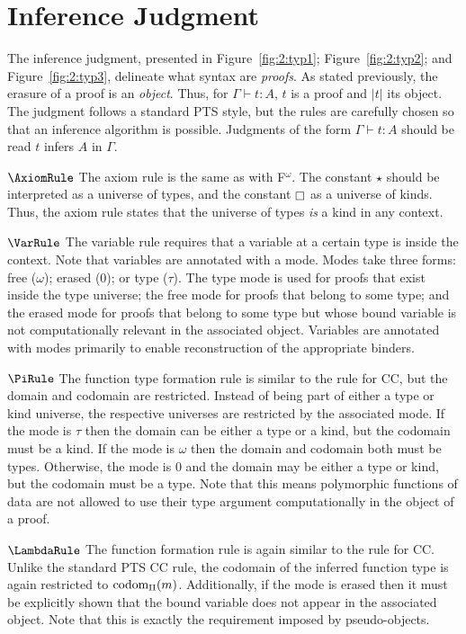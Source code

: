 \section{Inference Judgment}
\label{sec:2:judgments}


The inference judgment, presented in Figure~\ref{fig:2:typ1}; Figure~\ref{fig:2:typ2}; and Figure~\ref{fig:2:typ3}, delineate what syntax are \textit{proofs}.
As stated previously, the erasure of a proof is an \textit{object}.
Thus, for $\Gamma \vdash t : A$, $t$ is a proof and $|t|$ its object.
The judgment follows a standard PTS style, but the rules are carefully chosen so that an inference algorithm is possible.
Judgments of the form $\Gamma \vdash t : A$ should be read $t$ infers $A$ in $\Gamma$.

$\AxiomRule$ The axiom rule is the same as with F$^\omega$.
The constant $\star$ should be interpreted as a universe of types, and the constant $\kind$ as a universe of kinds.
Thus, the axiom rule states that the universe of types \textit{is} a kind in any context.

$\VarRule$ The variable rule requires that a variable at a certain type is inside the context.
Note that variables are annotated with a mode.
Modes take three forms: free ($\omega$); erased ($0$); or type ($\tau$).
The type mode is used for proofs that exist inside the type universe; the free mode for proofs that belong to some type; and the erased mode for proofs that belong to some type but whose bound variable is not computationally relevant in the associated object.
Variables are annotated with modes primarily to enable reconstruction of the appropriate binders.




$\PiRule$ The function type formation rule is similar to the rule for CC, but the domain and codomain are restricted.
Instead of being part of either a type or kind universe, the respective universes are restricted by the associated mode.
If the mode is $\tau$ then the domain can be either a type or a kind, but the codomain must be a kind.
If the mode is $\omega$ then the domain and codomain both must be types.
Otherwise, the mode is $0$ and the domain may be either a type or kind, but the codomain must be a type.
Note that this means polymorphic functions of data are not allowed to use their type argument computationally in the object of a proof.

$\LambdaRule$ The function formation rule is again similar to the rule for CC.
Unlike the standard PTS CC rule, the codomain of the inferred function type is again restricted to $\textnormal{codom}_\Pi(m)$.
Additionally, if the mode is erased then it must be explicitly shown that the bound variable does not appear in the associated object.
Note that this is exactly the requirement imposed by pseudo-objects.

